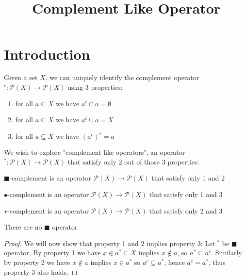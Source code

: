 

\newcommand{\clf}{\mbox{clf}}
\newcommand{\ICI}{\mathcal{ICI}}
\title{Complement Like Operator}

	
	\maketitle
	\section{Introduction}
	Given a set $X$, we can uniquely identify the complement operator $^c:\mathcal{P}(X)\to\mathcal{P}(X)$ using 3 properties:
	\begin{enumerate}
		\item{ for all $a\subseteq X$ we have $a^c\cap a=\emptyset$}
		\item{ for all $a\subseteq X$ we have $a^c\cup a=X$}
		\item{ for all $a\subseteq X$ we have $(a^c)^c=a$}
	\end{enumerate}
	We wish to explore "complement like operators", an operator $^*:\mathcal{P}(X)\to\mathcal{P}(X)$ that satisfy only 2 out of those 3 properties:
	
	
	\begin{definition}
		$\blacksquare$-complement is an operator $\mathcal{P}(X)\to\mathcal{P}(X)$ that satisfy only 1 and 2
	\end{definition}
	\begin{definition}
		$\bullet$-complement is an operator $\mathcal{P}(X)\to\mathcal{P}(X)$ that satisfy only 1 and 3
	\end{definition}
	\begin{definition}
		$\star$-complement is an operator $\mathcal{P}(X)\to\mathcal{P}(X)$ that satisfy only 2 and 3
	\end{definition}
	
	\begin{lemma}\label{lem:1.1}
		There are no $\blacksquare$ operator
	\end{lemma}
	\begin{proof}
		We will now show that property 1 and 2 implies property 3:\newline
		Let $^*$ be $\blacksquare$ operator, By property 1 we have $x\in a^*\subseteq X$ implies $x\notin a$, so $a^*\subseteq a^c$.\newline
		Similarly by property 2 we have $x\notin a$ implies $x\in a^*$ so $a^c\subseteq a^*$, hence $a^c=a^*$, thus property 3 also holds.
	\end{proof}
	
